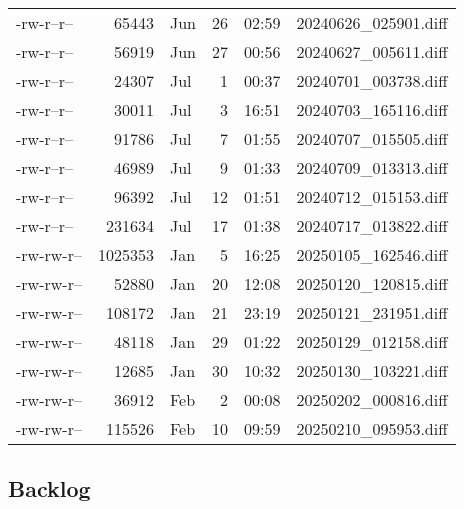 \documentclass[a4paper]{article}
\begin{document}
\begin{longtable}{lrlrrl}
-rw-r--r-- & 65443 & Jun & 26 & 02:59 & 20240626\_025901.diff\\[0pt]
-rw-r--r-- & 56919 & Jun & 27 & 00:56 & 20240627\_005611.diff\\[0pt]
-rw-r--r-- & 24307 & Jul & 1 & 00:37 & 20240701\_003738.diff\\[0pt]
-rw-r--r-- & 30011 & Jul & 3 & 16:51 & 20240703\_165116.diff\\[0pt]
-rw-r--r-- & 91786 & Jul & 7 & 01:55 & 20240707\_015505.diff\\[0pt]
-rw-r--r-- & 46989 & Jul & 9 & 01:33 & 20240709\_013313.diff\\[0pt]
-rw-r--r-- & 96392 & Jul & 12 & 01:51 & 20240712\_015153.diff\\[0pt]
-rw-r--r-- & 231634 & Jul & 17 & 01:38 & 20240717\_013822.diff\\[0pt]
-rw-rw-r-- & 1025353 & Jan & 5 & 16:25 & 20250105\_162546.diff\\[0pt]
-rw-rw-r-- & 52880 & Jan & 20 & 12:08 & 20250120\_120815.diff\\[0pt]
-rw-rw-r-- & 108172 & Jan & 21 & 23:19 & 20250121\_231951.diff\\[0pt]
-rw-rw-r-- & 48118 & Jan & 29 & 01:22 & 20250129\_012158.diff\\[0pt]
-rw-rw-r-- & 12685 & Jan & 30 & 10:32 & 20250130\_103221.diff\\[0pt]
-rw-rw-r-- & 36912 & Feb & 2 & 00:08 & 20250202\_000816.diff\\[0pt]
-rw-rw-r-- & 115526 & Feb & 10 & 09:59 & 20250210\_095953.diff\\[0pt]
\end{longtable}


\subsection{Backlog}
\label{sec:org380ec93}
\end{document}
